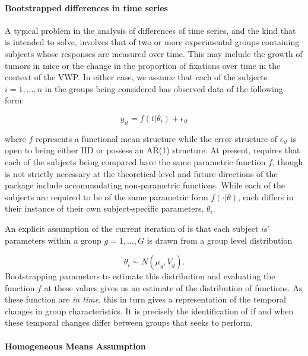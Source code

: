 \paragraph{Bootstrapped differences in time series}

A typical problem in the analysis of differences of time series, and the kind that  is intended to solve, involves that of two or more experimental groups containing subjects whose responses are measured over time. This may include the growth of tumors in  mice or the change in the proportion of fixations over time in the context of the VWP. In either case, we assume that each of the subjects $i = 1, \dots, n$ in the groups being considered has observed data of the following form:

\begin{equation}\label{eq:mean_structure}
y_{it} = f(t | \theta_i) + \epsilon_{it} 
\end{equation}


where $f$ represents a functional mean structure while the error structure of $\epsilon_{it}$ is open to being either IID or possess an AR(1) structure. At present,  requires that each of the subjects being compared have the same parametric function $f$, though is not strictly necessary at the theoretical level and future directions of the package include accommodating non-parametric functions. While each of the subjects are required to be of the same parametric form $f(\cdot | \theta)$, each differs in their instance of their own subject-specific parameters, $\theta_i$.

An explicit assumption of the current iteration of  is that each subject $i$s' parameters within a group $g = 1, \dots, G$ is drawn from a group level distribution

\begin{equation}\label{eq:group_dist}
\theta_i \sim N(\mu_g, V_g).
\end{equation}
Bootstrapping parameters to estimate this distribution and evaluating the function $f$ at these values gives us an estimate of the distribution of functions. As these function are \textit{in time}, this in turn gives a representation of the temporal changes in group characteristics. It is precisely the identification of if and when these temporal changes differ between groups that  seeks to perform.


\paragraph{Homogeneous Means Assumption}

